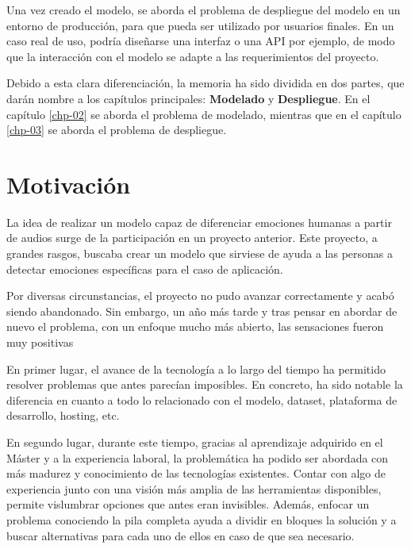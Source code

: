 Una vez creado el modelo, se aborda el problema de despliegue del modelo en un entorno de producción, para que pueda ser utilizado por usuarios finales.
En un caso real de uso, podría diseñarse una interfaz o una API por ejemplo, de modo que la interacción con el modelo se adapte a las requerimientos del proyecto.

\medskip

Debido a esta clara diferenciación, la memoria ha sido dividida en dos partes, que darán nombre a los capítulos principales: \textbf{Modelado} y \textbf{Despliegue}.
En el capítulo \ref{chp-02} se aborda el problema de modelado, mientras que en el capítulo \ref{chp-03} se aborda el problema de despliegue.

\section{Motivación}\label{sec:motivacion}

La idea de realizar un modelo capaz de diferenciar emociones humanas a partir de audios surge de la participación en un proyecto anterior.
Este proyecto, a grandes rasgos, buscaba crear un modelo que sirviese de ayuda a las personas a detectar emociones específicas para el caso de aplicación.

Por diversas circunstancias, el proyecto no pudo avanzar correctamente y acabó siendo abandonado.
Sin embargo, un año más tarde y tras pensar en abordar de nuevo el problema, con un enfoque mucho más abierto, las sensaciones fueron muy positivas

En primer lugar, el avance de la tecnología a lo largo del tiempo ha permitido resolver problemas que antes parecían imposibles.
En concreto, ha sido notable la diferencia en cuanto a todo lo relacionado con el modelo, dataset, plataforma de desarrollo, hosting, etc.

En segundo lugar, durante este tiempo, gracias al aprendizaje adquirido en el Máster y a la experiencia laboral, la problemática ha podido ser abordada con más madurez y conocimiento de las tecnologías existentes.
Contar con algo de experiencia junto con una visión más amplia de las herramientas disponibles, permite vislumbrar opciones que antes eran invisibles.
Además, enfocar un problema conociendo la pila completa ayuda a dividir en bloques la solución y a buscar alternativas para cada uno de ellos en caso de que sea necesario.

